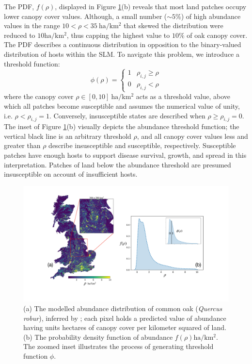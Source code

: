 The PDF, $f(\rho)$, displayed in Figure \ref{fig:uk-oak-l.hill}(b) 
reveals that most land patches occupy lower canopy cover values.
Although, a small number ($\sim 5\%$) of high abundance values in the range
$10<\rho<35\ \mathrm{ha/km^2}$ that skewed the distribution were reduced to $10\mathrm{ha/km^2}$, 
thus capping the highest value to $10\%$ of oak canopy cover. 
The PDF describes a continuous distribution in opposition to the binary-valued distribution of hosts 
within the SLM. To navigate this problem, we introduce a threshold function:  
\begin{equation}
  \phi(\rho) =
  \begin{cases}
    1 & \rho_{i,j}\geq\rho \\
    0 & \rho_{i,j}<\rho
  \end{cases}
\end{equation}
where the canopy cover $\rho\in[0, 10]\ \mathrm{ha/km^{2}}$ acts as a threshold value, 
above which all patches become susceptible and assumes the numerical value of unity, i.e. $\rho < \rho_{i,j} = 1$.
Conversely, insusceptible states are described when $\rho \geq \rho_{i,j}= 0$.
The inset of Figure \ref{fig:uk-oak-l.hill}(b) visually depicts the abundance threshold function; 
the vertical black line is an arbitrary threshold $\rho$, and all canopy cover values less and greater than
$\rho$ describe insusceptible and susceptible, respectively.
Susceptible patches have enough hosts to support disease survival, growth, and spread in this interpretation. %
Patches of land below the abundance threshold are presumed insusceptible on account of insufficient hosts.

\newpage

\begin{figure}
    \centering
    \includegraphics[scale=0.32]{chapter4/figures/figure3.pdf}
    \caption{
    (a) The modelled abundance distribution of common oak (\textit{Quercus robur}), inferred by \cite{hill.data}; each pixel holds a predicted value of abundance having units hectares of canopy cover per kilometer squared of land. 
    (b) The probability density function of abundance $f(\rho) \mathrm{ha/km^2}$. 
    The zoomed inset illustrates the process of generating threshold function $\phi$.}
    \label{fig:uk-oak-l.hill}
\end{figure}

